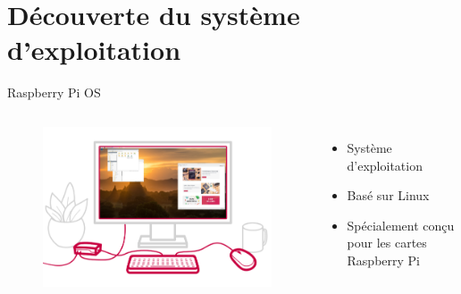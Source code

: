 \documentclass[aspectratio=169,xcolor=dvipsnames]{beamer}
\begin{document}
\section{Découverte du système d'exploitation}

\begin{frame}{Raspberry Pi OS}
    \begin{columns}[c] %

        \begin{figure}
            \includegraphics[width=1\textwidth]{1/rpi-os.png}
        \end{figure}

        \begin{itemize}
            \item Système d'exploitation
            \item Basé sur Linux
            \item Spécialement conçu pour les cartes Raspberry Pi
        \end{itemize}

    \end{columns}
\end{frame}

\end{document}
